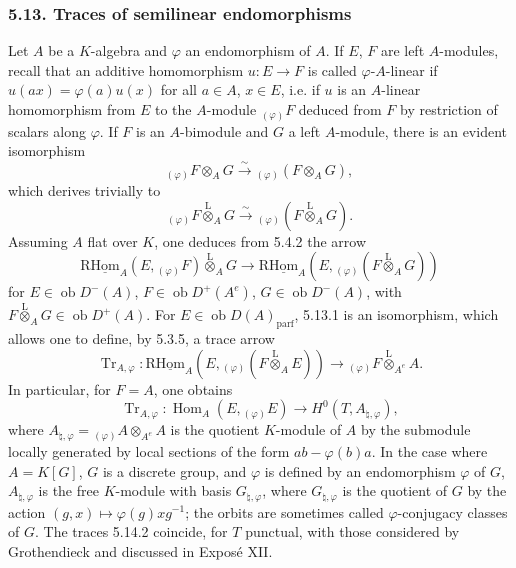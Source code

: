 \documentclass[11pt]{article}
\DeclareMathOperator{\Hom}{Hom}
\newcommand{\ob}{\operatorname{ob}}
\providecommand{\Tr}{\operatorname{Tr}}
\providecommand{\Tr}{\operatorname{Tr}}
\providecommand{\lten}{\overset{\mathrm L}{\otimes}}
\providecommand{\Tr}{\operatorname{Tr}}
\providecommand{\Hom}{\operatorname{Hom}}
\providecommand{\ob}{\operatorname{ob}}
\providecommand{\lten}{\overset{\mathrm L}{\otimes}}
\providecommand{\lten}{\overset{\mathrm L}{\otimes}}
\providecommand{\Tr}{\operatorname{Tr}}
\providecommand{\lten}{\overset{\mathrm L}{\otimes}}
\providecommand{\lten}{\overset{\mathrm L}{\otimes}}
\providecommand{\lten}{\overset{\mathrm L}{\otimes}}
\providecommand{\Hom}{\operatorname{Hom}}
\providecommand{\Tr}{\operatorname{Tr}}
\providecommand{\lten}{\overset{\mathrm L}{\otimes}}
\begin{document}
\subsubsection*{5.13. Traces of semilinear endomorphisms}

Let $A$ be a $K$-algebra and $\varphi$ an endomorphism of $A$. If $E$, $F$ are left $A$-modules, recall that an additive homomorphism $u:E\to F$ is called $\varphi$-$A$-linear if $u(ax)=\varphi(a)u(x)$ for all $a\in A$, $x\in E$, i.e. if $u$ is an $A$-linear homomorphism from $E$ to the $A$-module ${}_{(\varphi)}F$ deduced from $F$ by restriction of scalars along $\varphi$. If $F$ is an $A$-bimodule and $G$ a left $A$-module, there is an evident isomorphism
\[
{}_{(\varphi)}F\otimes_AG\xrightarrow{\sim}{}_{(\varphi)}(F\otimes_AG),
\]
which derives trivially to
\[
{}_{(\varphi)}F\lten_AG\xrightarrow{\sim}{}_{(\varphi)}(F\lten_AG).
\]
Assuming $A$ flat over $K$, one deduces from 5.4.2 the arrow
\begin{equation}\tag{5.13.1}
\mathrm{R}\underline{\mathrm{Hom}}_A(E,{}_{(\varphi)}F)\lten_AG\longrightarrow\mathrm{R}\underline{\mathrm{Hom}}_A(E,{}_{(\varphi)}(F\lten_AG))
\end{equation}
for $E\in\ob D^-(A)$, $F\in\ob D^+(A^e)$, $G\in\ob D^-(A)$, with $F\lten_AG\in\ob D^+(A)$. For $E\in\ob D(A)_{\mathrm{parf}}$, 5.13.1 is an isomorphism, which allows one to define, by 5.3.5, a trace arrow
\begin{equation}\tag{5.13.2}
\Tr_{A,\varphi}:\mathrm{R}\underline{\mathrm{Hom}}_A(E,{}_{(\varphi)}(F\lten_AE))\longrightarrow {}_{(\varphi)}F\lten_{A^e}A.
\end{equation}
In particular, for $F=A$, one obtains
\begin{equation}\tag{5.13.3}
\Tr_{A,\varphi}:\Hom_A(E,{}_{(\varphi)}E)\longrightarrow H^0(T,A_{\natural,\varphi}),
\end{equation}
where $A_{\natural,\varphi}={}_{(\varphi)}A\otimes_{A^e}A$ is the quotient $K$-module of $A$ by the submodule locally generated by local sections of the form $ab-\varphi(b)a$. In the case where $A=K[G]$, $G$ is a discrete group, and $\varphi$ is defined by an endomorphism $\varphi$ of $G$, $A_{\natural,\varphi}$ is the free $K$-module with basis $G_{\natural,\varphi}$, where $G_{\natural,\varphi}$ is the quotient of $G$ by the action $(g,x)\mapsto\varphi(g)xg^{-1}$; the orbits are sometimes called $\varphi$-conjugacy classes of $G$. The traces 5.14.2 coincide, for $T$ punctual, with those considered by Grothendieck and discussed in Exposé XII.
\end{document}
